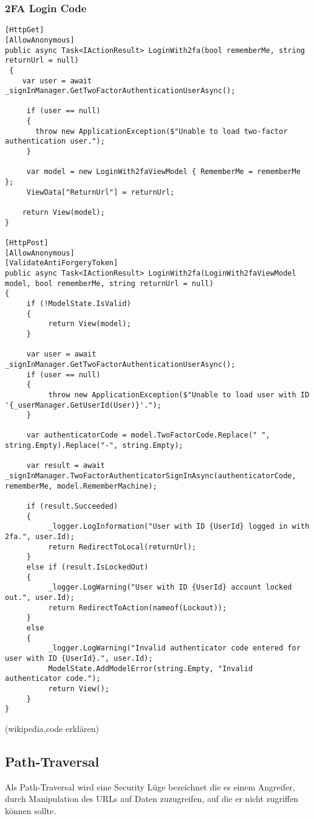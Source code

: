 \subsubsection{2FA Login Code}
\label{sec:2FALogin}
\begin{lstlisting}
[HttpGet]
[AllowAnonymous]
public async Task<IActionResult> LoginWith2fa(bool rememberMe, string returnUrl = null)
 {
    var user = await _signInManager.GetTwoFactorAuthenticationUserAsync();

     if (user == null)
     {
       throw new ApplicationException($"Unable to load two-factor authentication user.");
     }

     var model = new LoginWith2faViewModel { RememberMe = rememberMe };
     ViewData["ReturnUrl"] = returnUrl;

    return View(model);
}

[HttpPost]
[AllowAnonymous]
[ValidateAntiForgeryToken]
public async Task<IActionResult> LoginWith2fa(LoginWith2faViewModel model, bool rememberMe, string returnUrl = null)
{
     if (!ModelState.IsValid)
     {
          return View(model);
     }

     var user = await _signInManager.GetTwoFactorAuthenticationUserAsync();
     if (user == null)
     {
          throw new ApplicationException($"Unable to load user with ID '{_userManager.GetUserId(User)}'.");
     }

     var authenticatorCode = model.TwoFactorCode.Replace(" ", string.Empty).Replace("-", string.Empty);

     var result = await _signInManager.TwoFactorAuthenticatorSignInAsync(authenticatorCode, rememberMe, model.RememberMachine);

     if (result.Succeeded)
     {
          _logger.LogInformation("User with ID {UserId} logged in with 2fa.", user.Id);
          return RedirectToLocal(returnUrl);
     }
     else if (result.IsLockedOut)
     {
          _logger.LogWarning("User with ID {UserId} account locked out.", user.Id);
          return RedirectToAction(nameof(Lockout));
     }
     else
     {
          _logger.LogWarning("Invalid authenticator code entered for user with ID {UserId}.", user.Id);
          ModelState.AddModelError(string.Empty, "Invalid authenticator code.");
          return View();
     }
}
\end{lstlisting}
(wikipedia,code erklären)
\subsection{Path-Traversal}
\label{sec:Path-Traversal}
Als Path-Traversal wird eine Security Lüge bezeichnet die es einem Angreifer, durch Manipulation des URLs auf Daten zuzugreifen, auf die er nicht zugriffen können sollte. 
